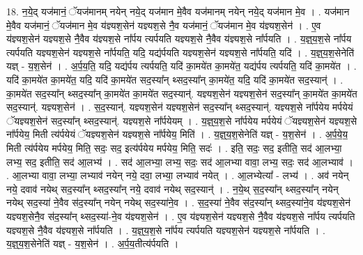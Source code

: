 \documentclass[17pt]{extarticle}
\begin{document}
18. न॒ये॒द् यज॑मानं॒ ॅयज॑मानम् नयेन् नये॒द् यज॑मान मे॒वैव यज॑मानम् नयेन् नये॒द् यज॑मान मे॒व । . यज॑मान मे॒वैव यज॑मानं॒ ॅयज॑मान मे॒व य॑ज्ञ्यश॒सेन॑ यज्ञ्यश॒से नै॒व यज॑मानं॒ ॅयज॑मान मे॒व य॑ज्ञ्यश॒सेन॑ । . ए॒व य॑ज्ञ्यश॒सेन॑ यज्ञ्यश॒से नै॒वैव य॑ज्ञ्यश॒से ना᳚र्पय त्यर्पयति यज्ञ्यश॒से नै॒वैव य॑ज्ञ्यश॒से ना᳚र्पयति । . य॒ज्ञ्॒य॒श॒से ना᳚र्पय त्यर्पयति यज्ञ्यश॒सेन॑ यज्ञ्यश॒से ना᳚र्पयति॒ यदि॒ यद्य॑र्पयति यज्ञ्यश॒सेन॑ यज्ञ्यश॒से ना᳚र्पयति॒ यदि॑ । . य॒ज्ञ्॒य॒श॒सेनेति॑ यज्ञ् - य॒श॒सेन॑ । . अ॒र्प॒य॒ति॒ यदि॒ यद्य॑र्पय त्यर्पयति॒ यदि॑ का॒मये॑त का॒मये॑त॒ यद्य॑र्पय त्यर्पयति॒ यदि॑ का॒मये॑त । . यदि॑ का॒मये॑त का॒मये॑त॒ यदि॒ यदि॑ का॒मये॑त सद॒स्या᳚न् थ्सद॒स्या᳚न् का॒मये॑त॒ यदि॒ यदि॑ का॒मये॑त सद॒स्यान्॑ । . का॒मये॑त सद॒स्या᳚न् थ्सद॒स्या᳚न् का॒मये॑त का॒मये॑त सद॒स्यान्॑. यज्ञ्यश॒सेन॑ यज्ञ्यश॒सेन॑ सद॒स्या᳚न् का॒मये॑त का॒मये॑त सद॒स्यान्॑. यज्ञ्यश॒सेन॑ । . स॒द॒स्यान्॑. यज्ञ्यश॒सेन॑ यज्ञ्यश॒सेन॑ सद॒स्या᳚न् थ्सद॒स्यान्॑. यज्ञ्यश॒से ना᳚र्पयेय मर्पयेयं ॅयज्ञ्यश॒सेन॑ सद॒स्या᳚न् थ्सद॒स्यान्॑. यज्ञ्यश॒से ना᳚र्पयेयम् । . य॒ज्ञ्॒य॒श॒से ना᳚र्पयेय मर्पयेयं ॅयज्ञ्यश॒सेन॑ यज्ञ्यश॒से ना᳚र्पयेय॒ मिती त्य॑र्पयेयं ॅयज्ञ्यश॒सेन॑ यज्ञ्यश॒से ना᳚र्पयेय॒ मिति॑ । . य॒ज्ञ्॒य॒श॒सेनेति॑ यज्ञ् - य॒श॒सेन॑ । . अ॒र्प॒ये॒य॒ मिती त्य॑र्पयेय मर्पयेय॒ मिति॒ सदः॒ सद॒ इत्य॑र्पयेय मर्पयेय॒ मिति॒ सदः॑ । . इति॒ सदः॒ सद॒ इतीति॒ सद॑ आ॒लभ्या॒ लभ्य॒ सद॒ इतीति॒ सद॑ आ॒लभ्य॑ । . सद॑ आ॒लभ्या॒ लभ्य॒ सदः॒ सद॑ आ॒लभ्या वावा॒ लभ्य॒ सदः॒ सद॑ आ॒लभ्याव॑ । . आ॒लभ्या वावा॒ लभ्या॒ लभ्याव॑ नयेन् नये॒ दवा॒ लभ्या॒ लभ्याव॑ नयेत् । . आ॒लभ्येत्या᳚ - लभ्य॑ । . अव॑ नयेन् नये॒ दवाव॑ नयेथ् सद॒स्या᳚न् थ्सद॒स्या᳚न् नये॒ दवाव॑ नयेथ् सद॒स्यान्॑ । . न॒ये॒थ् स॒द॒स्या᳚न् थ्सद॒स्या᳚न् नयेन् नयेथ् सद॒स्या॑ ने॒वैव स॑द॒स्या᳚न् नयेन् नयेथ् सद॒स्या॑ने॒व । . स॒द॒स्या॑ ने॒वैव स॑द॒स्या᳚न् थ्सद॒स्या॑ने॒व य॑ज्ञ्यश॒सेन॑ यज्ञ्यश॒सेनै॒व स॑द॒स्या᳚न् थ्सद॒स्या॑-ने॒व य॑ज्ञ्यश॒सेन॑ । . ए॒व य॑ज्ञ्यश॒सेन॑ यज्ञ्यश॒से नै॒वैव य॑ज्ञ्यश॒से ना᳚र्पय त्यर्पयति यज्ञ्यश॒से नै॒वैव य॑ज्ञ्यश॒से ना᳚र्पयति । . य॒ज्ञ्॒य॒श॒से ना᳚र्पय त्यर्पयति यज्ञ्यश॒सेन॑ यज्ञ्यश॒से ना᳚र्पयति । . य॒ज्ञ्॒य॒श॒सेनेति॑ यज्ञ् - य॒श॒सेन॑ । . अ॒र्प॒य॒तीत्य॑र्पयति । \newline
\pagebreak
{}
\end{document}
